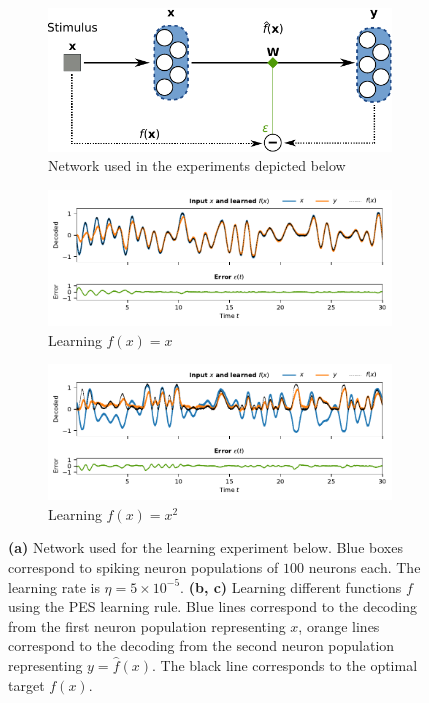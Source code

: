 \documentclass[10pt,letterpaper,oneside]{article}
\begin{document}
\begin{figure}[p]
	\centering
	\begin{subfigure}{\textwidth}
		\centering
		\includegraphics{media/learning_network.pdf}
		\caption{Network used in the experiments depicted below}
	\end{subfigure}
	\begin{subfigure}{\textwidth}
		\centering
		\includegraphics{media/pes_communication_channel_example.pdf}
		\caption{Learning $f(x) = x$}
		\label{fig:pes_communication_channel_example}
	\end{subfigure}
	\begin{subfigure}{\textwidth}
		\centering
		\includegraphics{media/pes_square_example.pdf}
		\caption{Learning $f(x) = x^2$}
		\label{fig:pes_square_example}
	\end{subfigure}
	\caption{\textbf{(a)} Network used for the learning experiment below. Blue boxes correspond to spiking neuron populations of $100$ neurons each. The learning rate is $\eta = 5 \times 10^{-5}$. \textbf{(b, c)} Learning different functions $f$ using the PES learning rule. Blue lines correspond to the decoding from the first neuron population representing $x$, orange lines correspond to the decoding from the second neuron population representing $y = \hat f(x)$. The black line corresponds to the optimal target $f(x)$. }
	\label{fig:pes_learning_network}
\end{figure}
\end{document}
